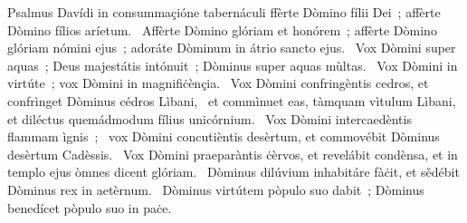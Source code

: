 { Psalmus Davídi in consummaçióne tabernáculi}
{%
ffèrte Dòmino fílii Dei~; affèrte Dòmino fílios aríetum. 
~Affèrte Dòmino glóriam et honórem~; affèrte Dòmino glóriam nómini ejus~; adoráte Dòminum in átrio sancto ejus. 
~Vox Dòmini super aquas~; Deus majestátis intónuit~; Dòminus super aquas mùltas. 
~Vox Dòmini in virtúte~; vox Dòmini in magnifiċènçia. 
~Vox Dòmini confringèntis cedros, et confrìnget Dòminus cédros Lìbani, 
~et commìnuet eas, tàmquam vìtulum Lìbani, et diléctus quemádmodum fílius unicórnium. 
~Vox Dòmini intercaedèntis flammam ìgnis~; 
~vox Dòmini concutièntis desèrtum, et commovébit Dòminus desèrtum Cadèssis. 
~Vox Dòmini praeparàntis ċèrvos, et revelábit condènsa, et in templo ejus òmnes dicent glóriam. 
~Dòminus dilúvium inhabitáre fàċit, et sědébit Dòminus rex in aetèrnum. 
~Dòminus virtútem pòpulo suo dabit~; Dòminus benedícet pòpulo suo in paċe. 
}
